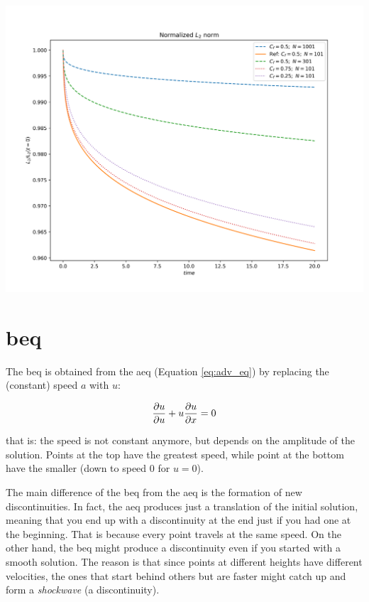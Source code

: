 \documentclass[11pt, a4paper]{article}
\begin{document}
\begin{center}
    \centering
    \includegraphics[width=0.9\linewidth]{images/L2_STEP_LAX-W.png}
    \label{fig:step_laxw_l2_tot}
\end{center}

\section{\acrfull{beq}}

The \acrlong{beq} is obtained from the \acrlong{aeq} (Equation \ref{eq:adv_eq}) by replacing the (constant) speed \(a\) with \(u\):

\begin{equation} \label{eq:burg_eq_nc}
    \pdv{u}{u} + u \pdv{u}{x} = 0
\end{equation}

\noindent
that is: the speed is not constant anymore, but depends on the amplitude of the solution. Points at the top have the greatest speed, while point at the bottom have the smaller (down to speed \(0\) for \(u = 0\)).

The main difference of the \acrshort{beq} from the \acrshort{aeq} is the formation of new discontinuities. In fact, the \acrshort{aeq} produces just a translation of the initial solution, meaning that you end up with a discontinuity at the end just if you had one at the beginning. That is because every point travels at the same speed. On the other hand, the \acrshort{beq} might produce a discontinuity even if you started with a smooth solution. The reason is that since points at different heights have different velocities, the ones that start behind others but are faster might catch up and form a \textit{shockwave} (a discontinuity).
\end{document}
